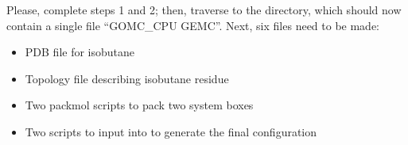\documentclass[letterpaper,10pt,english]{sphinxmanual}
\begin{document}
Please, complete steps 1 and 2; then, traverse to the directory, which should now contain a single file “GOMC\_CPU GEMC”. Next, six files need to be made:
\begin{itemize}
\item {} 
PDB file for isobutane

\item {} 
Topology file describing isobutane residue

\item {} 
Two  packmol scripts to pack two system boxes

\item {} 
Two  scripts to input into  to generate the final configuration

\end{itemize}



\renewcommand{\indexname}{Index}
\printindex
\end{document}
